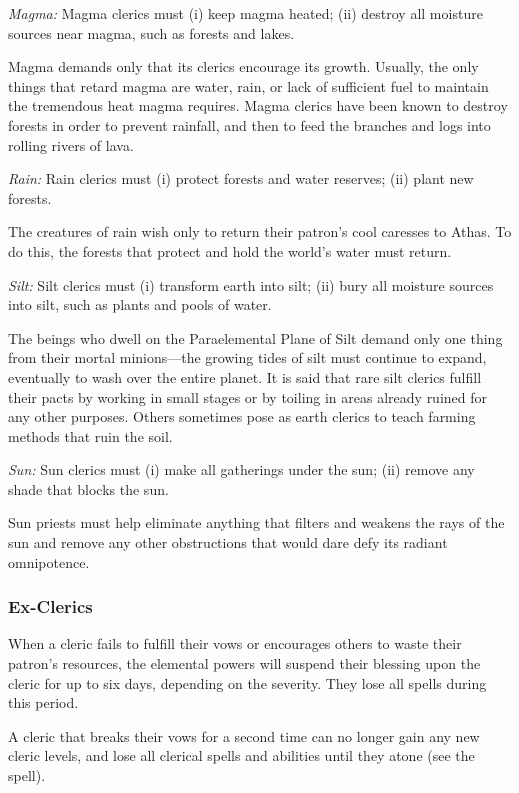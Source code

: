 \textit{Magma:} Magma clerics must
	(i) keep magma heated;
	(ii) destroy all moisture sources near magma, such as forests and lakes.

Magma demands only that its clerics encourage its growth. Usually, the only things that retard magma are water, rain, or lack of sufficient fuel to maintain the tremendous heat magma requires. Magma clerics have been known to destroy forests in order to prevent rainfall, and then to feed the branches and logs into rolling rivers of lava.

\textit{Rain:} Rain clerics must
	(i) protect forests and water reserves;
	(ii) plant new forests.

The creatures of rain wish only to return their patron's cool caresses to Athas. To do this, the forests that protect and hold the world's water must return.

\textit{Silt:} Silt clerics must
	(i) transform earth into silt;
	(ii) bury all moisture sources into silt, such as plants and pools of water.

The beings who dwell on the Paraelemental Plane of Silt demand only one thing from their mortal minions---the growing tides of silt must continue to expand, eventually to wash over the entire planet. It is said that rare silt clerics fulfill their pacts by working in small stages or by toiling in areas already ruined for any other purposes. Others sometimes pose as earth clerics to teach farming methods that ruin the soil.

\textit{Sun:} Sun clerics must
	(i) make all gatherings under the sun;
	(ii) remove any shade that blocks the sun.

Sun priests must help eliminate anything that filters and weakens the rays of the sun and remove any other obstructions that would dare defy its radiant omnipotence.

\subsubsection{Ex-Clerics}
When a cleric fails to fulfill their vows or encourages others to waste their patron's resources, the elemental powers will suspend their blessing upon the cleric for up to six days, depending on the severity. They lose all spells during this period.

A cleric that breaks their vows for a second time can no longer gain any new cleric levels, and lose all clerical spells and abilities until they atone (see the  spell).


